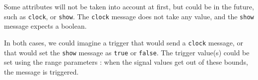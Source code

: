 \documentclass[a4paper]{article}
\newcommand{\OSC}[1]		{\texttt{#1}}
\begin{document}
Some attributes will not be taken into account at first, but could be in the future, such as \OSC{clock}, or \OSC{show}. The \OSC{clock} message does not take any value, and the \OSC{show} message expects a boolean.

In both cases, we could imagine a trigger that would send a \OSC{clock} message, or that would set the \OSC{show} message as \OSC{true} or \OSC{false}. The trigger value(s) could be set using the range parameters : when the signal values get out of these bounds, the message is triggered.




%
\end{document}
